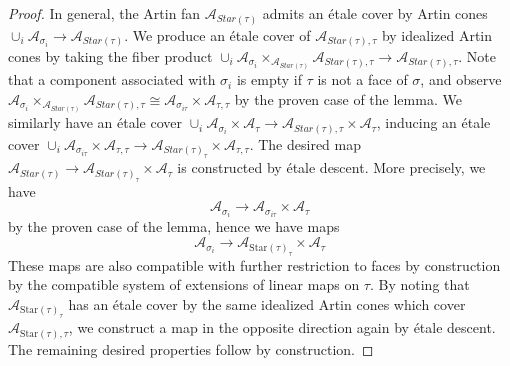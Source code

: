 \documentclass[12pt, oneside]{amsart}   	%
\numberwithin{equation}{section}
\numberwithin{thm}{section}
\numberwithin{figure}{section}
\begin{document}
\begin{proof}
In general, the Artin fan $\mathcal{A}_{Star(\tau)}$ admits an \'etale cover by Artin cones $\cup_i \mathcal{A}_{\sigma_i} \rightarrow \mathcal{A}_{Star(\tau)}$. We produce an \'etale cover of $\mathcal{A}_{Star(\tau),\tau}$ by idealized Artin cones by taking the fiber product $\cup_i \mathcal{A}_{\sigma_i}\times_{\mathcal{A}_{Star(\tau)}} \mathcal{A}_{Star(\tau),\tau} \rightarrow \mathcal{A}_{Star(\tau),\tau}$. Note that a component associated with $\sigma_i$ is empty if $\tau$ is not a face of $\sigma$, and observe $\mathcal{A}_{\sigma_i}\times_{\mathcal{A}_{Star(\tau)}} \mathcal{A}_{Star(\tau),\tau} \cong \mathcal{A}_{{\sigma}_{i\tau}} \times \mathcal{A}_{\tau,\tau} $ by the proven case of the lemma. We similarly have an \'etale cover $\cup_i \mathcal{A}_{{\sigma}_{i}} \times \mathcal{A}_{\tau} \rightarrow \mathcal{A}_{Star(\tau),{\tau}} \times \mathcal{A}_{\tau}$, inducing an \'etale cover $\cup_i \mathcal{A}_{\sigma_{i\tau}} \times \mathcal{A}_{\tau,\tau} \rightarrow \mathcal{A}_{Star(\tau)_{\tau}} \times \mathcal{A}_{\tau,\tau}$. The desired map $\mathcal{A}_{Star(\tau)} \rightarrow\mathcal{A}_{Star(\tau)_{\tau}} \times \mathcal{A}_{\tau}$ is constructed by \'etale descent. More precisely, we have 
$$\mathcal{A}_{\sigma_i} \rightarrow \mathcal{A}_{\sigma_{i\tau}}\times \mathcal{A}_{\tau}$$ by the proven case of the lemma, hence we have maps $$\mathcal{A}_{\sigma_i} \rightarrow \mathcal{A}_{\text{Star}(\tau)_{\tau}}\times \mathcal{A}_{\tau}$$
 These maps are also compatible with further restriction to faces by construction by the compatible system of extensions of linear maps on $\tau$. By noting that $\mathcal{A}_{\text{Star}(\tau)_\tau}$ has an \'etale cover by the same idealized Artin cones which cover $\mathcal{A}_{\text{Star}(\tau),\tau}$, we construct a map in the opposite direction again by \'etale descent.  The remaining desired properties follow by construction.





\end{proof}
\end{document}
